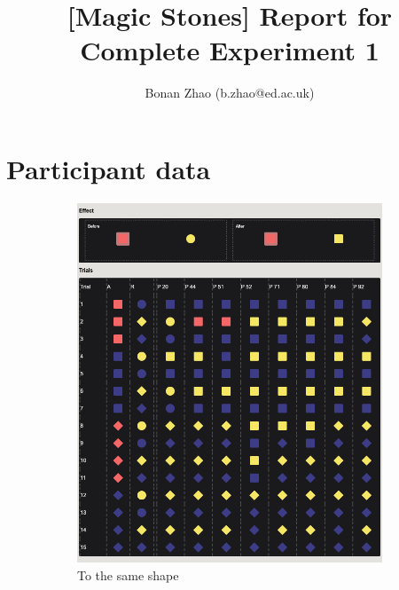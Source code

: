\documentclass{article}
\title{[Magic Stones] Report for Complete Experiment 1}
\author{Bonan Zhao (b.zhao@ed.ac.uk)}
\begin{document}
\maketitle

\section{Participant data}

\begin{figure}[h!]
	\centering
  \begin{subfigure}[t]{0.32\textwidth}
  	\centering
  	\includegraphics[width=\linewidth]{learn01} 
  	\caption{To the same shape} \label{fig:learn01}
  \end{subfigure}
  \hfill
  \begin{subfigure}[t]{0.32\textwidth}
  	\centering

\end{subfigure}
\end{figure}
\end{document}
